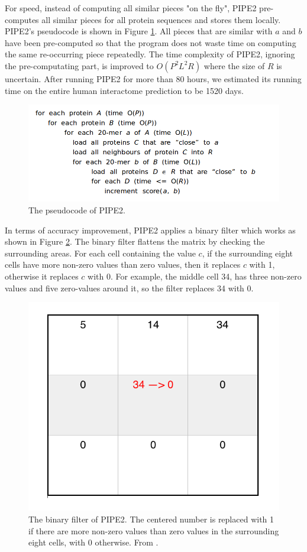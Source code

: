 For speed, instead of computing all similar pieces "on the fly", PIPE2 pre-computes all similar pieces for all protein sequences and stores them locally. PIPE2's pseudocode is shown in Figure \ref{fig_pseudocode_pipe2}. All pieces that are similar with $a$ and $b$ have been pre-computed so that the program does not waste time on computing the same re-occurring piece repeatedly. The time complexity of PIPE2, ignoring the pre-computating part, is improved to $O(P^2L^2R)$ where the size of $R$ is uncertain. After running PIPE2 for more than 80 hours, we estimated its running time on the entire human interactome prediction to be 1520 days.   
\begin{figure}[h!]
\begin{center}
\includegraphics[width =15cm]{img/PIPE2_psedu.png}
\caption[The pseudocode of PIPE2]{The pseudocode of PIPE2.  \label{fig_pseudocode_pipe2}}
\end{center}
\end{figure} 

In terms of accuracy improvement, PIPE2 applies a binary filter which works as shown in Figure \ref{fig_binary_filter}. The binary filter flattens the matrix by checking the surrounding areas. For each cell containing the value $c$, if the surrounding eight cells have more non-zero values than zero values, then it replaces $c$ with 1, otherwise it replaces $c$ with 0. For example, the middle cell 34, has three non-zero values and five zero-values around it, so the filter replaces 34 with 0.

\begin{figure}[h!]
\begin{center}
\includegraphics[height = 4 cm]{img/binary_filter.png}
\caption[The binary filter of PIPE2]{The binary filter of PIPE2. The centered number is replaced with 1 if there are more non-zero values than zero values in the surrounding eight cells, with 0 otherwise. From \cite{Pitre08_PIPE2}. \label{fig_binary_filter}}
\end{center}
\end{figure} 

